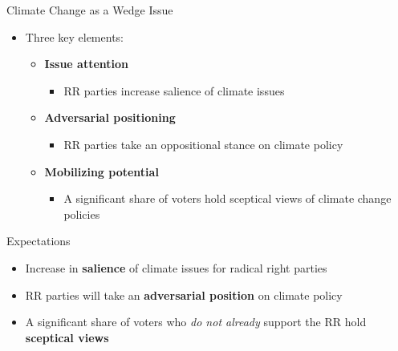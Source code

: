 \documentclass[
  ignorenonframetext,
]{beamer}
\providecommand{\tightlist}{%
  \setlength{\itemsep}{0pt}\setlength{\parskip}{0pt}}\usepackage{longtable,booktabs,array}
\begin{document}
\begin{frame}{Climate Change as a Wedge Issue}
\label{climate-change-as-a-wedge-issue}
\begin{itemize}[<+->]
\tightlist
\item
  Three key elements:

  \begin{itemize}[<+->]
  \tightlist
  \item
    \textbf{Issue attention}

    \begin{itemize}[<+->]
    \tightlist
    \item
      RR parties increase salience of climate issues
    \end{itemize}
  \item
    \textbf{Adversarial positioning}

    \begin{itemize}[<+->]
    \tightlist
    \item
      RR parties take an oppositional stance on climate policy
    \end{itemize}
  \item
    \textbf{Mobilizing potential}

    \begin{itemize}[<+->]
    \tightlist
    \item
      A significant share of voters hold sceptical views of climate
      change policies
    \end{itemize}
  \end{itemize}
\end{itemize}
\end{frame}

\begin{frame}{Expectations}
\label{expectations}
\begin{itemize}[<+->]
\tightlist
\item
  Increase in \textbf{salience} of climate issues for radical right
  parties
\item
  RR parties will take an \textbf{adversarial position} on climate
  policy
\item
  A significant share of voters who \emph{do not already} support the RR
  hold \textbf{sceptical views}
\end{itemize}
\end{frame}
\end{document}
